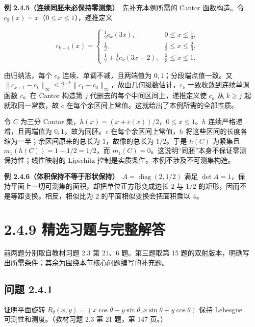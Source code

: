 \documentclass[11pt,a4paper]{article}
\begin{document}
\textbf{例 2.4.5（连续同胚未必保持零测集）}　先补充本例所需的 Cantor
函数构造。令 \(c_0(x)=x\)（\(0\le x\le1\)），递推定义

\begin{equation*}
c_{k+1}(x)=\begin{cases}
\frac12c_k(3x),&0\le x\le\frac13,\\
\frac12,&\frac13\le x\le\frac23,\\
\frac12+\frac12c_k(3x-2),&\frac23\le x\le1.
\end{cases}
\end{equation*}

由归纳法，每个 \(c_k\) 连续、单调不减，且两端值为
\(0,1\)；分段端点值一致。又
\(\|c_{k+1}-c_k\|_\infty\le2^{-k}\|c_1-c_0\|_\infty\)，故由几何级数估计，\(c_k\)
一致收敛到连续单调函数 \(c\)。在 Cantor 构造第 \(j\)
代删去的每个中间区间上，递推定义使 \(c_k\) 从 \(k\ge j\)
起就取同一常数，故 \(c\)
在每个余区间上常值。这就给出了本例所需的全部性质。

令 \(C\) 为三分 Cantor 集，\(h(x)=(x+c(x))/2\)，\(0\le x\le1\)。\(h\)
连续严格递增，且两端值为 \(0,1\)，故为同胚。\(c\)
在每个余区间上常值，\(h\) 将这些区间的长度各缩为一半；余区间原来的总长为
\(1\)，故像的总长为 \(1/2\)。于是 \(h(C)\) 为紧集且
\(m_1(h(C))=1-1/2=1/2\)，而
\(m_1(C)=0\)。这说明``同胚''本身不保证零测保持性；线性映射的 Lipschitz
控制是实质条件。本例不涉及不可测集构造。

\textbf{例
2.4.6（体积保持不等于形状保持）}　\(A=\operatorname{diag}(2,1/2)\) 满足
\(\det A=1\)，保持平面上一切可测集的面积，却把单位正方形变成边长 \(2\)
与 \(1/2\) 的矩形，因而不是等距变换。相反，相似比为 \(2\)
的平面相似变换会把面积乘以 \(4\)。

\section[\S{}2.4.9
精选习题与完整解答]{2.4.9
精选习题与完整解答}\label{ux7cbeux9009ux4e60ux9898ux4e0eux5b8cux6574ux89e3ux7b54}

前两题分别取自教材习题 2.3 第 21、6 题。第三题取第 15
题的双射版本，明确写出所需条件；其余为围绕本节核心问题编写的补充题。

\subsection{问题 2.4.1}\label{ux95eeux9898-2.4.1}

证明平面旋转
\(R_\theta(x,y)=(x\cos\theta-y\sin\theta,x\sin\theta+y\cos\theta)\) 保持
Lebesgue 可测性和测度。（教材习题 2.3 第 21 题，第 147 页。）
\end{document}
